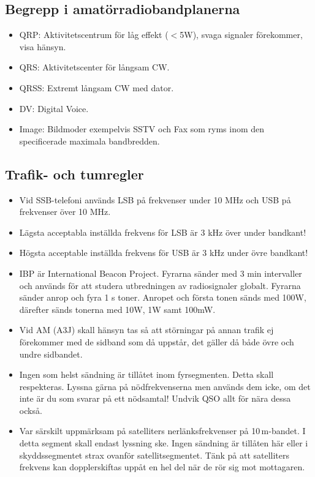 {\begin{landscape}
\end{landscape}


\clearpage

\subsection{Begrepp i amatörradiobandplanerna}

\begin{itemize}
\item QRP: Aktivitetscentrum för låg effekt ($<$5W), svaga signaler
      förekommer, visa hänsyn.
\item QRS: Aktivitetscenter för långsam CW.
\item QRSS: Extremt långsam CW med dator.
\item DV: Digital Voice.
\item Image: Bildmoder exempelvis SSTV och Fax som ryms inom den specificerade
	  maximala bandbredden.
\end{itemize}

\subsection{Trafik- och tumregler}

\begin{itemize}
\item Vid SSB-telefoni används LSB på frekvenser under 10 MHz och USB
      på frekvenser över 10 MHz.
\item Lägsta acceptabla inställda frekvens för LSB är 3 kHz över
      under bandkant!
\item Högsta acceptable inställda frekvens för USB är 3 kHz under
      övre bandkant!
\item IBP är International Beacon Project. Fyrarna sänder med 3 min
      intervaller och används för att studera utbredningen av
      radiosignaler globalt. Fyrarna sänder anrop och fyra 1 s toner.
      Anropet och första tonen sänds med 100W, därefter sänds tonerna
      med 10W, 1W samt 100mW.
\item Vid AM (A3J) skall hänsyn tas så att störningar på annan trafik ej fö\-re\-kom\-mer
      med de sidband som då uppstår, det gäller då både övre och undre
      sidbandet.
\item Ingen som helst sändning är tillåtet inom fyrsegmenten. Detta skall respekteras.
      Lyssna gärna på nödfrekvenserna men används dem icke, om det
      inte är du som svarar på ett nödsamtal! Undvik QSO allt för nära
      dessa också.
\item Var särskilt uppmärksam på satelliters nerlänksfrekvenser på 10\,m-bandet.
      I detta segment skall endast lyssning ske. Ingen sändning är
      tillåten här eller i skyddssegmentet strax ovanför
      satellitsegmentet. Tänk på att satelliters frekvens kan
      dopplerskiftas uppåt en hel del när de rör sig mot mottagaren.
\end{itemize}

}
